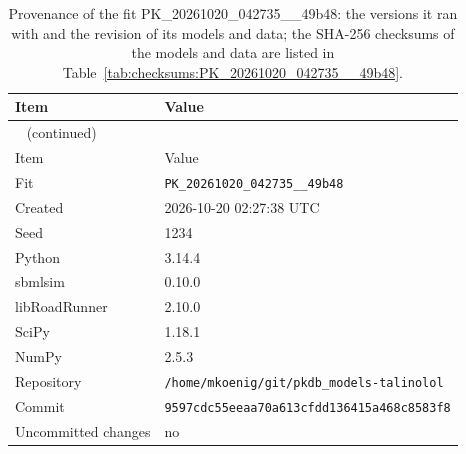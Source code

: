 \begin{longtable}{ll}
\caption{Provenance of the fit PK\_20261020\_042735\_\_49b48: the versions it ran with and the revision of its models and data; the SHA-256 checksums of the models and data are listed in Table~\ref{tab:checksums:PK_20261020_042735__49b48}.}\label{tab:provenance:PK_20261020_042735__49b48} \\
\toprule
Item & Value \\
\midrule
\endfirsthead
\multicolumn{2}{l}{\small\tablename~\thetable{} (continued)} \\
\toprule
Item & Value \\
\midrule
\endhead
\bottomrule
\endlastfoot
Fit & \texttt{PK\_20261020\_042735\_\_49b48} \\
Created & 2026-10-20 02:27:38 UTC \\
Seed & 1234 \\
Python & 3.14.4 \\
sbmlsim & 0.10.0 \\
libRoadRunner & 2.10.0 \\
SciPy & 1.18.1 \\
NumPy & 2.5.3 \\
Repository & \texttt{/home/mkoenig/git/pkdb\_models-talinolol} \\
Commit & \texttt{9597cdc55eeaa70a613cfdd136415a468c8583f8} \\
Uncommitted changes & no \\
\end{longtable}



